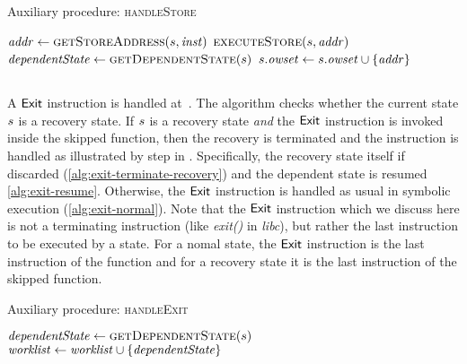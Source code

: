 \begin{algorithm}
  \caption{Auxiliary procedure: \textsc{handleStore}
  \label{fig:aux-handle-store}}
\begin{algorithmic}[1]

\State $\addr \gets \Call{getStoreAddress}{\workstate, \inst}$
\State $\Call{executeStore}{\workstate,\addr}$ \label{alg:store-normal}
 \label{alg:store-check-recovery}
  \State $\dependentState \gets \Call{getDependentState}{\workstate}$
  \State {} \label{alg:store-udpate-dep-states}
\Else
  \State $s.\mathit{owset} \gets s.\mathit{owset} \cup \{\mathit{addr}\}$ \label{alg:record-overwrite}
\EndIf
\EndFunction
\end{algorithmic}
\end{algorithm}

\subsection{}
A $\mathsf{Exit}$ instruction is handled at~.
The algorithm checks whether the current state $s$ is a
recovery state. If $s$ is a recovery state \emph{and} the
$\mathsf{Exit}$ instruction is invoked inside the skipped function,
then the recovery is terminated and the instruction is handled as
illustrated by step  in .
Specifically, the recovery state itself if discarded (\cref{alg:exit-terminate-recovery})
and the dependent state is resumed \cref{alg:exit-resume}.
Otherwise, the $\mathsf{Exit}$ instruction is handled as usual in symbolic execution (\cref{alg:exit-normal}).
Note that the $\mathsf{Exit}$ instruction which we discuss here
is not a terminating instruction (like \textit{exit()} in \textit{libc}),
but rather the last instruction to be executed by a state.
For a nomal state, the $\mathsf{Exit}$ instruction is the last instruction of the  function
and for a recovery state it is the last instruction of the skipped function.

\begin{algorithm}
  \caption{Auxiliary procedure: \textsc{handleExit}
  \label{fig:aux-handle-exit}}
\begin{algorithmic}[1]

 \label{alg:exit-check-recovery}
  \State {} \label{alg:exit-terminate-recovery}
  \State $\dependentState \gets  \Call{getDependentState}{\workstate}$ \label{alg:exit-extract-dependent}
  \State {} \label{alg:exit-resume}
  \State $\mathit{worklist} \gets  \mathit{worklist} \cup \{\mathit{dependentState}\}$
\Else
  \State {}  \label{alg:exit-normal}
  \label{alg:push-worklist-exit}
\EndIf
\EndFunction
\end{algorithmic}
\end{algorithm}

